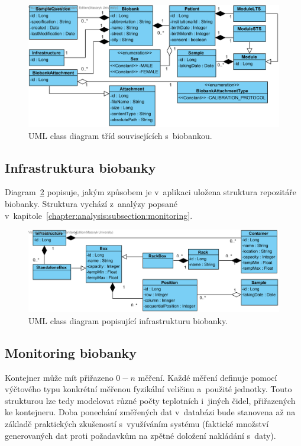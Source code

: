 \documentclass[11pt, draft, oneside]{fithesis2}
\begin{document}
\begin{figure}[h!]
\begin{center}
	\includegraphics[width=\textwidth]{BiobankView}
\caption{UML class diagram tříd souvisejících s~biobankou.}
\label{fig:index:uml:class:biobank}
\end{center}
\end{figure}

\subsection{Infrastruktura biobanky}
Diagram~\ref{fig:index:uml:class:infrastructure} popisuje, jakým způsobem je v~aplikaci uložena struktura repozitáře biobanky. Struktura vychází z~analýzy popsané v~kapitole~\ref{chapter:analysis:subsection:monitoring}.

\begin{figure}[h!]
\begin{center}
	\includegraphics[width=\textwidth]{InfrastructureView}
\caption{UML class diagram popisující infrastrukturu biobanky.}
\label{fig:index:uml:class:infrastructure}
\end{center}
\end{figure}

\subsection{Monitoring biobanky}
Kontejner může mít přiřazeno $0-n$ měření. Každé měření definuje pomocí výčtového typu konkrétní měřenou fyzikální veličinu a~použité jednotky. Touto strukturou lze tedy modelovat různé počty teplotních i~jiných čidel, přiřazených ke kontejneru. 
Doba ponechání změřených dat v~databázi bude stanovena až na základě praktických zkušeností s~využíváním systému (faktické množství generovaných dat proti požadavkům na zpětné doložení nakládání s~daty).
\end{document}
